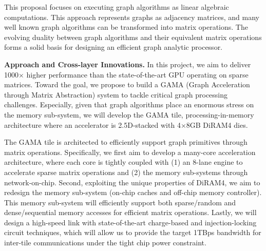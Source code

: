 \noindent
This proposal focuses on executing graph algorithms as linear algebraic computations. 
This approach represents graphs as adjacency matrices, and many well known graph algorithms can be transformed into matrix operations. 
The evolving 
duality between graph algorithms and their equivalent matrix operations forms a solid basis 
for designing an efficient graph analytic processor. 

\vspace{3pt}
\noindent
\textbf{Approach and Cross-layer Innovations.} 
In this project, we aim to deliver 1000$\times$ higher performance than the state-of-the-art GPU operating on sparse matrices.
Toward the goal, we propose to build a GAMA (Graph Acceleration through Matrix Abstraction) system to tackle critical graph processing challenges. 
Especially, given that graph algorithms place an enormous stress on the memory sub-system, 
we will develop the GAMA tile, processing-in-memory architecture where an accelerator is 2.5D-stacked with 4$\times$8GB DiRAM4 dies.

The GAMA tile is architected to efficiently support %
graph primitives through matrix operations.
Specifically, we first aim to develop a many-core %
acceleration architecture, where
each %
core is tightly coupled with (1) an 8-lane engine to accelerate sparse matrix operations and (2) the memory sub-systems through network-on-chip.
Second, exploiting the unique properties of DiRAM4, we aim to redesign the memory sub-system (on-chip caches and off-chip memory controller). %
This memory sub-system will efficiently support both sparse/random and dense/sequential memory accesses for efficient matrix operations. 
Lastly, we will design a high-speed link with state-of-the-art charge-based and injection-locking circuit techniques, which will allow us to provide the target 1TBps bandwidth for inter-tile communications under the tight chip power constraint.


